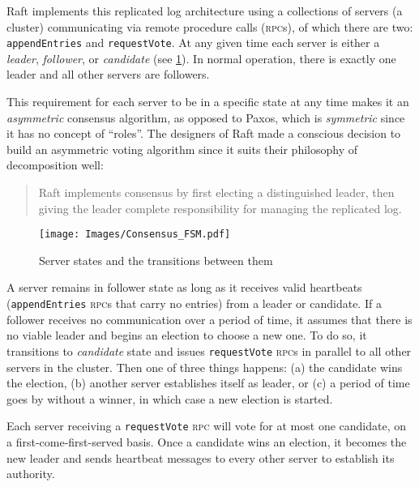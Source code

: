 \documentclass[11pt,chapterprefix=true,toc=bibliography,numbers=noendperiod,
               footnotes=multiple,twoside]{scrreprt}
\newcommand{\requestVoteRPC}[0]{\texttt{requestVote} \textsc{rpc}}
\newcommand{\appendEntriesRPC}[0]{\texttt{appendEntries} \textsc{rpc}}
\begin{document}
Raft implements this replicated log architecture using a collections of servers (a cluster) communicating via remote procedure calls (\textsc{rpc}s), of which there are two: \texttt{appendEntries} and \texttt{requestVote}. At any given time each server is either a \emph{leader}, \emph{follower}, or \emph{candidate} (see \cref{fig:consensus-fsm}). In normal operation, there is exactly one leader and all other servers are followers.

This requirement for each server to be in a specific state at any time makes it an \emph{asymmetric} consensus algorithm, as opposed to Paxos, which is \emph{symmetric} since it has no concept of \enquote{roles}. The designers of Raft made a conscious decision to build an asymmetric voting algorithm since it suits their philosophy of decomposition well:

\begin{quote}
    Raft implements consensus by first electing a distinguished leader, then giving the leader complete responsibility for managing the replicated log.\autocite[section 5]{raft}
\end{quote}

\begin{figure}[h]
    \centering
    \texttt{[image: Images/Consensus\_FSM.pdf]}
    \caption{Server states and the transitions between them}
    \label{fig:consensus-fsm}
\end{figure}


A server remains in follower state as long as it receives valid heartbeats (\appendEntriesRPC s that carry no entries) from a leader or candidate. If a follower receives no communication over a period of time, it assumes that there is no viable leader and begins an election to choose a new one. To do so, it transitions to \textit{candidate} state and issues \requestVoteRPC s in parallel to all other servers in the cluster. Then one of three things happens: (a) the candidate wins the election, (b) another server establishes itself as leader, or (c) a period of time goes by without a winner, in which case a new election is started.

Each server receiving a \requestVoteRPC{} will vote for at most one candidate, on a first-come-first-served basis. Once a candidate wins an election, it becomes the new leader and sends heartbeat messages to every other server to establish its authority.

\end{document}
